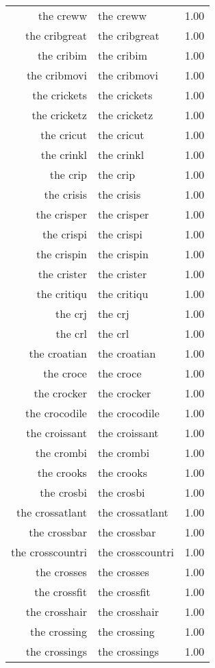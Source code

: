 \begin{table}[ht]
\begin{tabular}{rlr}
  the creww & the creww & 1.00 \\ 
  the cribgreat & the cribgreat & 1.00 \\ 
  the cribim & the cribim & 1.00 \\ 
  the cribmovi & the cribmovi & 1.00 \\ 
  the crickets & the crickets & 1.00 \\ 
  the cricketz & the cricketz & 1.00 \\ 
  the cricut & the cricut & 1.00 \\ 
  the crinkl & the crinkl & 1.00 \\ 
  the crip & the crip & 1.00 \\ 
  the crisis & the crisis & 1.00 \\ 
  the crisper & the crisper & 1.00 \\ 
  the crispi & the crispi & 1.00 \\ 
  the crispin & the crispin & 1.00 \\ 
  the crister & the crister & 1.00 \\ 
  the critiqu & the critiqu & 1.00 \\ 
  the crj & the crj & 1.00 \\ 
  the crl & the crl & 1.00 \\ 
  the croatian & the croatian & 1.00 \\ 
  the croce & the croce & 1.00 \\ 
  the crocker & the crocker & 1.00 \\ 
  the crocodile & the crocodile & 1.00 \\ 
  the croissant & the croissant & 1.00 \\ 
  the crombi & the crombi & 1.00 \\ 
  the crooks & the crooks & 1.00 \\ 
  the crosbi & the crosbi & 1.00 \\ 
  the crossatlant & the crossatlant & 1.00 \\ 
  the crossbar & the crossbar & 1.00 \\ 
  the crosscountri & the crosscountri & 1.00 \\ 
  the crosses & the crosses & 1.00 \\ 
  the crossfit & the crossfit & 1.00 \\ 
  the crosshair & the crosshair & 1.00 \\ 
  the crossing & the crossing & 1.00 \\ 
  the crossings & the crossings & 1.00 \\ 

\end{tabular}
\end{table}
